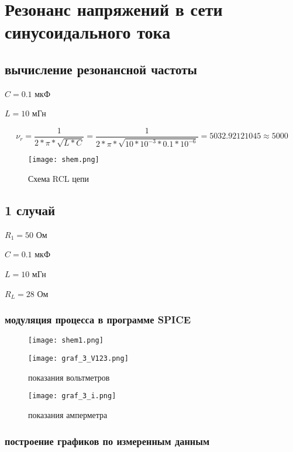 \documentclass[a4paper,14pt]{article}
\begin{document}


\section{Резонанс напряжений в сети синусоидального тока}
\subsection{вычисление резонансной частоты}
$C =  0.1$ мкФ 

$L = 10$ мГн

$$\nu_r = \dfrac{1}{2*\pi * \sqrt{L*C}} =\dfrac{1}{2*\pi* \sqrt{10 * 10^{-3}*0.1*10^{-6}}} = 5032.92121045 \approx 5000 $$

\begin{figure}[H]
	\centering
	\texttt{[image: shem.png]}
	\caption{Схема RCL цепи}	
\end{figure}


\subsection{1 случай}
$R_1 = 50$ Ом 

$C =  0.1$ мкФ 

$L = 10$ мГн

$R_L = 28$ Ом

\subsubsection{модуляция процесса в программе SPICE}

\begin{figure}[H]
	\centering
	\texttt{[image: shem1.png]}	
\end{figure}

\begin{figure}[H]
	\centering
	\texttt{[image: graf\_3\_V123.png]}
	\caption{показания вольтметров}	
\end{figure}

\begin{figure}[H]
	\centering
	\texttt{[image: graf\_3\_i.png]}
	\caption{показания амперметра}	
\end{figure}

\subsubsection{построение графиков по измеренным данным}
\end{document}
